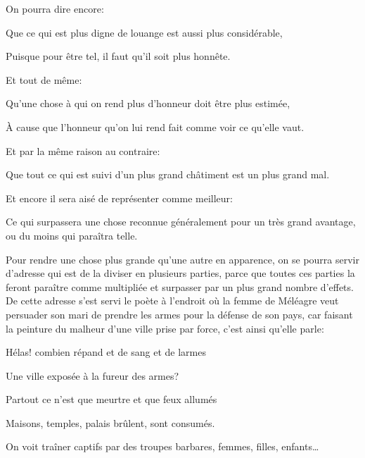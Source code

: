 On pourra dire encore:

\begin{emphpar}
	Que ce qui est plus digne de louange est aussi plus considérable,
\end{emphpar}

Puisque pour être tel, il faut qu'il soit plus honnête.

\bigbreak

Et tout de même:

\begin{emphpar}
	Qu'une chose à qui on rend plus d'honneur doit être plus estimée,
\end{emphpar}

À cause que l'honneur qu'on lui rend fait comme voir ce qu'elle vaut.

Et par la même raison au contraire:

\begin{emphpar}
	Que tout ce qui est suivi d'un plus grand châtiment est un plus grand mal.
\end{emphpar}

\bigbreak

Et encore il sera aisé de représenter comme meilleur:

\begin{emphpar}
	Ce qui surpassera une chose reconnue généralement pour un très grand avantage, ou du moins qui paraîtra telle.
\end{emphpar}

\bigbreak

Pour rendre une chose plus grande qu'une autre en apparence, on se pourra servir d'adresse qui est de la diviser en
plusieurs parties, parce que toutes ces parties la feront paraître comme multipliée et surpasser par un plus grand
nombre d'effets. De cette adresse s'est servi le poète à l'endroit où la femme de Méléagre veut persuader son mari de
prendre les armes pour la défense de son pays, car faisant la peinture du malheur d'une ville prise par force, c'est
ainsi qu'elle parle:

\begin{emphpar}
  Hélas! combien répand et de sang et de larmes

  Une ville exposée à la fureur des armes?

  Partout ce n'est que meurtre et que feux allumés

  Maisons, temples, palais brûlent, sont consumés.

  On voit traîner captifs par des troupes barbares, femmes, filles, enfants\dots
\end{emphpar}

